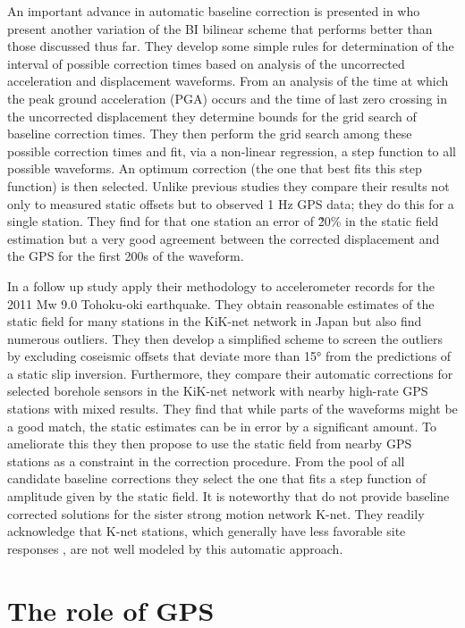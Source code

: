 An important advance in automatic baseline correction is presented in \citet{Wang2011} who present another variation of the BI bilinear scheme that performs better than those discussed thus far. They develop some simple rules for determination of the interval of possible correction times based on analysis of the uncorrected acceleration and displacement waveforms. From an analysis of the time at which the peak ground acceleration (PGA) occurs and the time of last zero crossing in the uncorrected displacement they determine bounds for the grid search of baseline correction times. They then perform the grid search among these possible correction times and fit, via a non-linear regression, a step function to all possible waveforms. An optimum correction (the one that best fits this step function) is then selected. Unlike previous studies they compare their results not only to measured static offsets but to observed 1 Hz GPS data; they do this for a single station. They find for that one station an error of \~20\% in the static field estimation but a very good agreement between the corrected displacement and the GPS for the first 200s of the waveform.

In a follow up study \citet{Wang2013} apply their methodology to accelerometer records for the 2011 Mw 9.0 Tohoku-oki earthquake. They obtain reasonable estimates of the static field for many stations in the KiK-net network in Japan but also find numerous outliers. They then develop a simplified scheme to screen the outliers by excluding coseismic offsets that deviate more than 15° from the predictions of a static slip inversion. Furthermore, they compare their automatic corrections for selected borehole sensors in the KiK-net network with nearby high-rate GPS stations with mixed results. They find that while parts of the waveforms might be a good match, the static estimates can be in error by a significant amount. To ameliorate this they then propose to use the static field from nearby GPS stations as a constraint in the correction procedure. From the pool of all candidate baseline corrections they select the one that fits a step function of amplitude given by the static field. It is noteworthy that \citet{Wang2013} do not provide baseline corrected solutions for the sister strong motion network K-net. They readily acknowledge that K-net stations, which generally have less favorable site responses \citep{Tsuda2006}, are not well modeled by this automatic approach. 


\section{The role of GPS}

